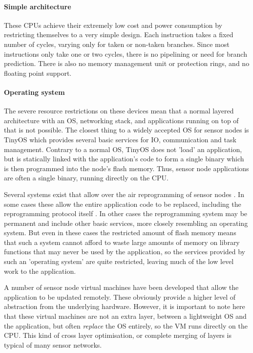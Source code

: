 \paragraph{Simple architecture}
These CPUs achieve their extremely low cost and power consumption by restricting themselves to a very simple design. Each instruction takes a fixed number of cycles, varying only for taken or non-taken branches. Since most instructions only take one or two cycles, there is no pipelining or need for branch prediction. There is also no memory management unit or protection rings, and no floating point support.

\paragraph{Operating system}
The severe resource restrictions on these devices mean that a normal layered architecture with an OS, networking stack, and applications running on top of that is not possible. The closest thing to a widely accepted OS for sensor nodes is TinyOS \cite{Levis:2004ws} which provides several basic services for IO, communication and task management. Contrary to a normal OS, TinyOS does not 'load' an application, but is statically linked with the application's code to form a single binary which is then programmed into the node's flash memory. Thus, sensor node applications are often a single binary, running directly on the CPU.

Several systems exist that allow over the air reprogramming of sensor nodes \cite{Quadri:2014wr}. In some cases these allow the entire application code to be replaced, including the reprogramming protocol itself \cite{Reijers:2003ww}. In other cases the reprogramming system may be permanent and include other basic services, more closely resembling an operating system. But even in these cases the restricted amount of flash memory means that such a system cannot afford to waste large amounts of memory on library functions that may never be used by the application, so the services provided by such an 'operating system' are quite restricted, leaving much of the low level work to the application.

A number of sensor node virtual machines have been developed that allow the application to be updated remotely. These obviously provide a higher level of abstraction from the underlying hardware. However, it is important to note here that these virtual machines are not an extra layer, between a lightweight OS and the application, but often \emph{replace} the OS entirely, so the VM runs directly on the CPU. This kind of cross layer optimisation, or complete merging of layers is typical of many sensor networks.

